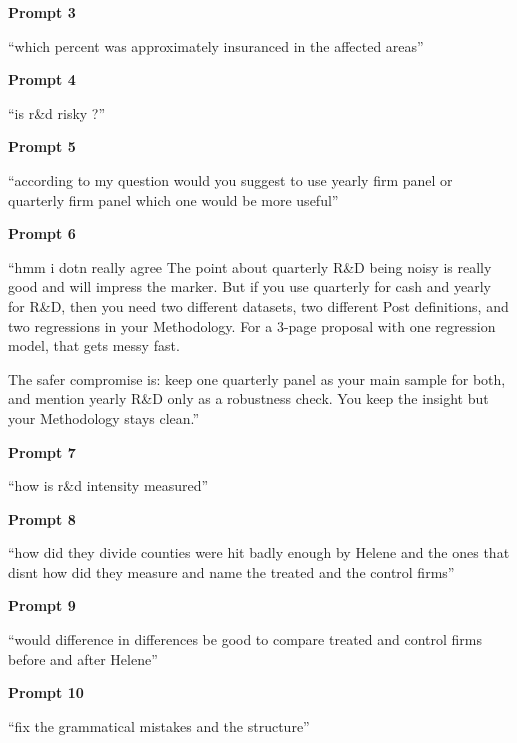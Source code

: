 \textbf{Prompt 3}\par\nopagebreak
{\itshape\raggedright
“which percent was approximately insuranced in the affected areas”\par}

\textbf{Prompt 4}\par\nopagebreak
{\itshape\raggedright
“is r\&d risky ?”\par}

\textbf{Prompt 5}\par\nopagebreak
{\itshape\raggedright
“according to my question would you suggest to use yearly firm panel or quarterly firm panel which one would be more useful”\par}

\newpage
\textbf{Prompt 6}\par\nopagebreak
{\itshape\raggedright
“hmm i dotn really agree The point about quarterly R\&D being noisy is really good and will impress the marker. But if you use quarterly for cash and yearly for R\&D, then you need two different datasets, two different Post definitions, and two regressions in your Methodology. For a 3-page proposal with one regression model, that gets messy fast.

The safer compromise is: keep one quarterly panel as your main sample for both, and mention yearly R\&D only as a robustness check. You keep the insight but your Methodology stays clean.”\par}

\textbf{Prompt 7}\par\nopagebreak
{\itshape\raggedright
“how is r\&d intensity measured”\par}

\textbf{Prompt 8}\par\nopagebreak
{\itshape\raggedright
“how did they divide counties were hit badly enough by Helene and the ones that disnt how did they measure and name the treated and the control firms”\par}

\textbf{Prompt 9}\par\nopagebreak
{\itshape\raggedright
“would difference in differences be good to compare treated and control firms before and after Helene”\par}

\textbf{Prompt 10}\par\nopagebreak
{\itshape\raggedright
“fix the grammatical mistakes and the structure”\par}
\clearpage
\endgroup
